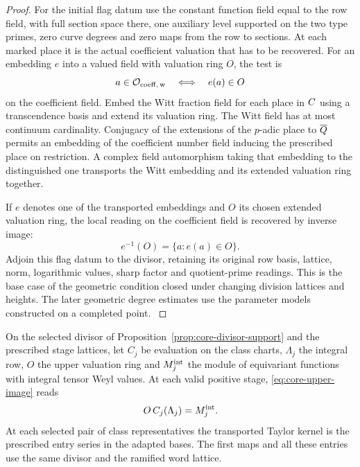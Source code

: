 \begin{proof}
For the initial flag datum use the constant function field equal
to the row field, with full section space there, one auxiliary
level supported on the two type primes, zero curve degrees and
zero maps from the row to sections. At each marked place it is the actual coefficient valuation that has to be recovered. For an embedding \(e\) into a valued field with valuation ring \(O\), the test is
\[
 a\in\mathcal O_{\rm coeff,\,w}\quad\Longleftrightarrow\quad e(a)\in O
\]
on the coefficient field. Embed the Witt fraction
field for each place in \(C\) using a transcendence basis and
extend its valuation ring. The Witt field has at most continuum
cardinality. Conjugacy of the extensions of the \(p\)-adic place
to \(\overline{Q}\) permits an embedding of the coefficient
number field inducing the prescribed place on restriction.
A complex field automorphism taking that embedding to the
distinguished one transports the Witt embedding and its
extended valuation ring together.

If \(e\) denotes one of the transported embeddings and \(O\) its chosen extended valuation ring, the local reading on the coefficient field is recovered by inverse image:
\[
 e^{-1}(O)=\{a:e(a)\in O\}.
\] Adjoin
this flag datum to the divisor, retaining its original row
basis, lattice, norm, logarithmic values, sharp factor and
quotient-prime readings. This is the base case of the geometric
condition closed under changing division lattices and heights.
The later geometric degree estimates use the parameter models
constructed on a completed point.
\label{cor:level-four-core-6}
\end{proof}

\begin{proposition}\label{prop:level-four-integral-kernel}
On the selected divisor of Proposition~\ref{prop:core-divisor-support}
and the prescribed stage lattices,
let \(C_j\) be evaluation on the class charts, \(\Lambda_j\) the integral row, \(O\) the upper valuation ring and \(M_j^{\rm int}\) the module of equivariant functions with integral tensor Weyl values. At each valid positive stage, \eqref{eq:core-upper-image} reads
\[
 O\,C_j(\Lambda_j)=M_j^{\rm int}.
\] At each selected pair of
class representatives the transported Taylor kernel is
the prescribed entry series in the adapted bases.
The first maps and all these entries use the same divisor
and the ramified word lattice.
\end{proposition}

